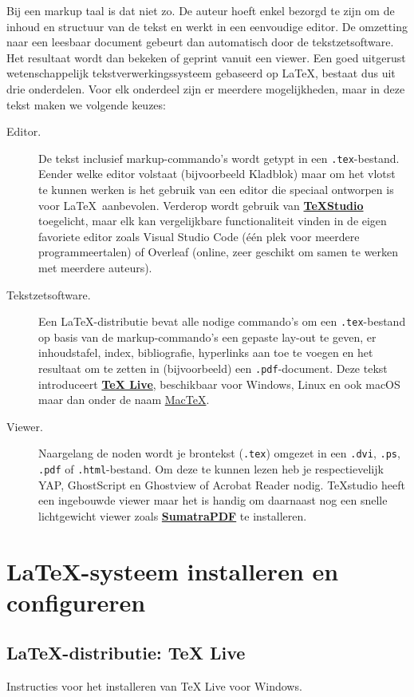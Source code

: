 \documentclass[kulak]{kulakarticle} %
\begin{document}
Bij een markup taal is dat niet zo. De auteur hoeft enkel bezorgd te zijn om de inhoud en structuur van de tekst en werkt in een eenvoudige editor. De omzetting naar een leesbaar document gebeurt dan automatisch door de tekstzetsoftware. Het resultaat wordt dan bekeken of geprint vanuit een viewer. Een goed uitgerust wetenschappelijk tekstverwerkingssysteem gebaseerd op \LaTeX, bestaat dus uit drie onderdelen. Voor elk onderdeel zijn er meerdere mogelijkheden, maar in deze tekst maken we volgende keuzes:
\begin{description}
	\item[Editor.] De tekst inclusief markup-commando's wordt getypt in een \texttt{.tex}-bestand. Eender welke editor volstaat (bijvoorbeeld Kladblok) maar om het vlotst te kunnen werken is het gebruik van een editor die speciaal ontworpen is voor \LaTeX\ aanbevolen. Verderop wordt gebruik van \href{http://texstudio.sourceforge.net/}{\textbf{TeXStudio}} toegelicht, maar elk kan vergelijkbare functionaliteit vinden in de eigen favoriete editor zoals Visual Studio Code (één plek voor meerdere programmeertalen) of Overleaf (online, zeer geschikt om samen te werken met meerdere auteurs).
	\item[Tekstzetsoftware.] Een \LaTeX-distributie bevat alle nodige commando's om een \texttt{.tex}-bestand op basis van de markup-commando's een gepaste lay-out te geven, er inhoudstafel, index, bibliografie, hyperlinks aan toe te voegen  en het resultaat om te zetten in (bijvoorbeeld) een \texttt{.pdf}-document. Deze tekst introduceert \href{http://www.tug.org/texlive/}{\textbf{TeX Live}}, beschikbaar voor Windows, Linux en ook macOS maar dan onder de naam \href{http://www.tug.org/mactex}{MacTeX}.
	\item[Viewer.] Naargelang de noden wordt je brontekst (\texttt{.tex}) omgezet in een \texttt{.dvi}, \texttt{.ps}, \texttt{.pdf} of \texttt{.html}-bestand. Om deze te kunnen lezen heb je respectievelijk YAP, GhostScript en Ghostview of Acrobat Reader nodig. TeXstudio heeft een ingebouwde viewer maar het is handig om daarnaast nog een snelle lichtgewicht viewer zoals \href{https://www.sumatrapdfreader.org/}{\textbf{SumatraPDF}} te installeren.
\end{description}

\section{\LaTeX-systeem installeren en configureren}
\label{sec:texlive}
\subsection{\LaTeX-distributie: TeX Live}
Instructies voor het installeren van TeX Live voor Windows.
\end{document}
